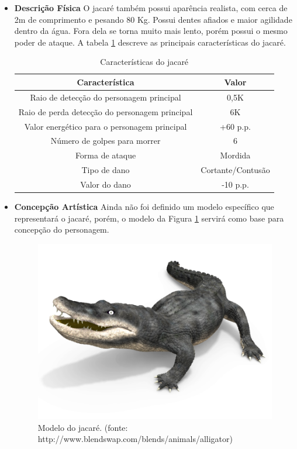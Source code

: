 \begin{itemize}
\item {\bf Descrição Física}
O jacaré também possui aparência realista, com cerca de 2m de comprimento e
 pesando 80 Kg. Possui dentes afiados e maior agilidade dentro da água.
 Fora dela se torna muito mais lento, porém possui o mesmo poder de ataque.
 A tabela \ref{table:jacare} descreve as principais características do jacaré.

\begin{table}[ht]
\begin{center}
\begin{tabular}{|c|c|}
\hline 
\textbf{Característica} & \textbf{Valor} \\ 
\hline 
Raio de detecção do personagem principal & 0,5K \\ 
\hline 
Raio de perda detecção do personagem principal & 6K \\ 
\hline 
Valor energético para o personagem principal & +60 p.p. \\ 
\hline 
Número de golpes para morrer & 6 \\ 
\hline 
Forma de ataque & Mordida \\ 
\hline 
Tipo de dano & Cortante/Contusão \\ 
\hline 
Valor do dano & -10 p.p. \\ 
\hline 
\end{tabular} 
\caption{Características do jacaré}
\label{table:jacare}
\end{center}
\end{table}

\item {\bf Concepção Artística}
Ainda não foi definido um modelo específico que representará o jacaré,
 porém, o modelo da Figura \ref{img:jacare} servirá como base para concepção do
 personagem.
\newpage
\begin{figure}[ht]
 \centering
 \includegraphics[scale=1]{Imagens/jacare01.png}
 \caption{Modelo do jacaré. (fonte: http://www.blendswap.com/blends/animals/alligator)}
\label{img:jacare}
\end{figure}


\end{itemize}
